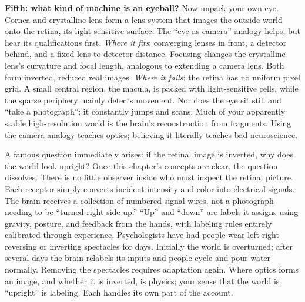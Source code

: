 \begin{mainline}
\textbf{Fifth: what kind of machine is an eyeball?} Now unpack your own eye. Cornea and crystalline lens form a lens system that images the outside world onto the retina, its light-sensitive surface. The ``eye as camera'' analogy helps, but hear its qualifications first. \emph{Where it fits}: converging lenses in front, a detector behind, and a fixed lens-to-detector distance. Focusing changes the crystalline lens's curvature and focal length, analogous to extending a camera lens. Both form inverted, reduced real images. \emph{Where it fails}: the retina has no uniform pixel grid. A small central region, the macula, is packed with light-sensitive cells, while the sparse periphery mainly detects movement. Nor does the eye sit still and ``take a photograph''; it constantly jumps and scans. Much of your apparently stable high-resolution world is the brain's reconstruction from fragments. Using the camera analogy teaches optics; believing it literally teaches bad neuroscience.

A famous question immediately arises: if the retinal image is inverted, why does the world look upright? Once this chapter's concepts are clear, the question dissolves. There is no little observer inside who must inspect the retinal picture. Each receptor simply converts incident intensity and color into electrical signals. The brain receives a collection of numbered signal wires, not a photograph needing to be ``turned right-side up.'' ``Up'' and ``down'' are labels it assigns using gravity, posture, and feedback from the hands, with labeling rules entirely calibrated through experience. Psychologists have had people wear left-right-reversing or inverting spectacles for days. Initially the world is overturned; after several days the brain relabels its inputs and people cycle and pour water normally. Removing the spectacles requires adaptation again. Where optics forms an image, and whether it is inverted, is physics; your sense that the world is ``upright'' is labeling. Each handles its own part of the account.

\end{mainline}

